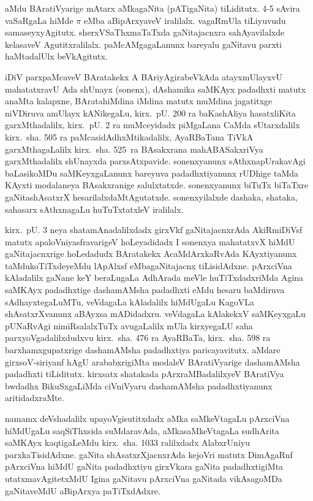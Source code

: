 aMdu BAratiVyarige mAtarx aMkagaNita (pATigaNita) tiLiditutx. {\rm 4-5} sAvira vaSaRgaLa hiMde $\pi$ eMba aBipArxyaveV iralilalx. vagaRmUla tiLiyuvudu samaseyx\-yAgitutx. sherxVSaThxmaTaTxda gaNitajacnxra sahAyavilalxde kelasaveV Agutitxralilalx. paMcAMgagaLanunx bareyalu gaNitavu parxti haMtadalUlx beVkAgitutx.

iDiV parxpaMcaveV BAratakekx A BAriyAgirabeVkAda atayxmUlayxvU mahatatxravU Ada shUnayx (sonenx), dAshamika saMKAyx padadhxti matutx anaMta kalapxne, BArata\break hiMdina iMdina matutx muMdina jagatitxge niVDiruva amUlayx kANikegaLu, kirx.~pU. {\rm 200} ra baKashAliya hasatxliKita garxMthadalilx, kirx.~pU. {\rm 2} ra muMceyidadx piMgaLana CaMda sUtarxdalilx kirx.~sha. {\rm 505} ra paMcasidAdhxMtikadalilx, AyaRBaTana TiVkA garxMthagaLalilx kirx.~sha. {\rm 525}~ra BAsakxrana mahABASakxriVya garxMthadalilx shUnayxda parxsAtxpavide. sonenxyanunx sAthxnapUrakavAgi baLasikoMDu saMKeyxgaLanunx bareyuva padadhxtiyanunx rUDhige taMda KAyxti modalaneya BAsakxranige salulxtatxde. sonenxyanunx biTuTx biTaTxre gaNitashAsatxrX hesarilalx\-daMtAgutatxde. sonenxyilalxde dashaka, shataka, sahasarx sAthxnagaLu huTuTxtatxleV iralilalx. 

kirx.~pU. {\rm 3} neya shatamAnadalilxdadx girxVkf gaNitajacnxrAda AkiRmiDiVsf matutx apaloV\-niyasfravarigeV hoLeyadidadx I sonenxya mahatatxvX hiMdU gaNitajacnxrige hoLedadudx BAratakekx AcaMdArxkaRvAda KAyxtiyanunx taMdukoTiTxdeyeMdu lApAlxsf eMba\break gaNitajacnx tiLisidAdxne. pArxciVna kAladalilx gaNane keY beraLugaLa AdhArada meVle huTiTxdadx\-riMda Agina saMKAyx padadhxtige dashamAMsha padadhxti eMdu hesaru baMdiruva sAdhayxtegaLuMTu, veVdagaLa kAladalilx hiMdUgaLu KagoVLa shAsatxrXvanunx aBAyxsa mADidadxru. veVdagaLa kAlakekxV saMKeyxgaLu pUNaRvAgi nimiRsalalxTuTx avugaLalilx mUla kirxyegaLU saha parxyoVgadalilxdudxvu kirx.~sha. {\rm 476} ra AyaRBaTa, kirx.~sha. {\rm 598} ra barxhamxgupatxrige dashamAMsha padadhxtiya paricayavitutx. aMdare girxsoV-siriyanf hAgU arababxrigiMta modaleV BAratiVyarige dashamAMsha padadhxti tiLiditutx. kirxsatx shatakada pArxraMBadalilxyeV BAratiVya bwdadhx BikuSxgaLiMda ciVniVyaru dashamAMsha padadhxtiyanunx aritidadxraMte.

namamx deVshadalilx upayoVgisutitxdadx aMka saMkeVtagaLu pArxciVna hiMdUgaLu saqSiThx\-sida suMdaravAda, aMkasaMkeVtagaLa sudhArita saMKAyx kaqtigaLeMdu kirx.~sha. {\rm 1033} ralilxdadx AlabxrUniyu parxkaTisidAdxne. gaNita shAsatxrXjacnxrAda kejoVri matutx DimAgaRnf pArxciVna hiMdU gaNita padadhxtiyu girxVkara gaNita padadhxtigiMta utatxmavAgitetxMdU Igina gaNitavu pArxciVna gaNitada vikAsagoMDa gaNitaveMdU aBipArxya paTiTxdAdxre.

